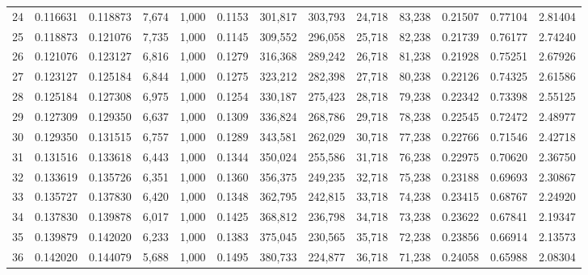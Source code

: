 \begin{tabular}{rrrrrrrrrrrrr}
24  &  0.116631 &  0.118873 &   7,674 &  1,000 &                                     0.1153 &  301,817 &  303,793 &   24,718 &   83,238 &  0.21507 &  0.77104 &  2.81404 \\
25  &  0.118873 &  0.121076 &   7,735 &  1,000 &                                     0.1145 &  309,552 &  296,058 &   25,718 &   82,238 &  0.21739 &  0.76177 &  2.74240 \\
26  &  0.121076 &  0.123127 &   6,816 &  1,000 &                                     0.1279 &  316,368 &  289,242 &   26,718 &   81,238 &  0.21928 &  0.75251 &  2.67926 \\
27  &  0.123127 &  0.125184 &   6,844 &  1,000 &                                     0.1275 &  323,212 &  282,398 &   27,718 &   80,238 &  0.22126 &  0.74325 &  2.61586 \\
28  &  0.125184 &  0.127308 &   6,975 &  1,000 &                                     0.1254 &  330,187 &  275,423 &   28,718 &   79,238 &  0.22342 &  0.73398 &  2.55125 \\
29  &  0.127309 &  0.129350 &   6,637 &  1,000 &                                     0.1309 &  336,824 &  268,786 &   29,718 &   78,238 &  0.22545 &  0.72472 &  2.48977 \\
30  &  0.129350 &  0.131515 &   6,757 &  1,000 &                                     0.1289 &  343,581 &  262,029 &   30,718 &   77,238 &  0.22766 &  0.71546 &  2.42718 \\
31  &  0.131516 &  0.133618 &   6,443 &  1,000 &                                     0.1344 &  350,024 &  255,586 &   31,718 &   76,238 &  0.22975 &  0.70620 &  2.36750 \\
32  &  0.133619 &  0.135726 &   6,351 &  1,000 &                                     0.1360 &  356,375 &  249,235 &   32,718 &   75,238 &  0.23188 &  0.69693 &  2.30867 \\
33  &  0.135727 &  0.137830 &   6,420 &  1,000 &                                     0.1348 &  362,795 &  242,815 &   33,718 &   74,238 &  0.23415 &  0.68767 &  2.24920 \\
34  &  0.137830 &  0.139878 &   6,017 &  1,000 &                                     0.1425 &  368,812 &  236,798 &   34,718 &   73,238 &  0.23622 &  0.67841 &  2.19347 \\
35  &  0.139879 &  0.142020 &   6,233 &  1,000 &                                     0.1383 &  375,045 &  230,565 &   35,718 &   72,238 &  0.23856 &  0.66914 &  2.13573 \\
36  &  0.142020 &  0.144079 &   5,688 &  1,000 &                                     0.1495 &  380,733 &  224,877 &   36,718 &   71,238 &  0.24058 &  0.65988 &  2.08304 \\

\end{tabular}
